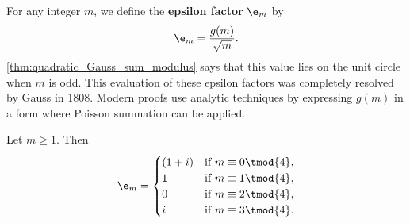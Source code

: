 \documentclass[12pt]{article}
\begin{document}
      For any integer \(m\), we define the \textbf{epsilon factor} \(\e_{m}\) by
      \[
        \e_{m} = \frac{g(m)}{\sqrt{m}}.
      \]
      \cref{thm:quadratic_Gauss_sum_modulus} says that this value lies on the unit circle when \(m\) is odd. This evaluation of these epsilon factors was completely resolved by Gauss in 1808. Modern proofs use analytic techniques by expressing \(g(m)\) in a form where Poisson summation can be applied.

      \begin{theorem}\label{thm:Gauss's_evaluation}
        Let \(m \ge 1\). Then
        \[
          \e_{m} = \begin{cases} (1+i) & \text{if \(m \equiv 0 \tmod{4}\)}, \\ 1 & \text{if \(m \equiv 1 \tmod{4}\)}, \\ 0 & \text{if \(m \equiv 2 \tmod{4}\)}, \\ i & \text{if \(m \equiv 3 \tmod{4}\)}. \end{cases}
        \]
      \end{theorem}
\end{document}
